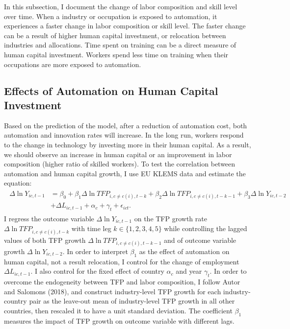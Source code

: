 \documentclass[12pt]{article}
\begin{document}
In this subsection, I document the change of labor composition and skill level over time. When a industry or occupation is exposed to automation, it experiences a faster change in labor composition or skill level. The faster change can be a result of higher human capital investment, or relocation between industries and allocations. Time spent on training can be a direct measure of human capital investment. Workers spend less time on training when their occupations are more exposed to automation. 

\subsection{Effects of Automation on Human Capital Investment}
Based on the prediction of the model, after a reduction of automation cost, both automation and innovation rates will increase. In the long run, workers respond to the change in technology by investing more in their human capital. As a result, we should observe an increase in human capital or an improvement in labor composition (higher ratio of skilled workers). To test the correlation between automation and human capital growth, I use EU KLEMS data and estimate the equation:
\begin{align}
\begin{split}
 \Delta \ln Y_{i c, t-1} &=\beta_{0}+\beta_{1} \Delta \ln TFP_{i, c \neq c(i), t-k} +\beta_{2} \Delta \ln TFP_{i, c \neq c(i), t-k-1}+\beta_{3} \Delta \ln Y_{i c, t-2}\\
 &+\Delta L_{i c, t-1}+\alpha_{c}+\gamma_{t}+\epsilon_{ict}.
 \end{split}
\end{align}
I regress the outcome variable $\Delta \ln Y_{i c, t-1}$ on the TFP growth rate $\Delta \ln TFP_{i, c \neq c(i), t-k}$ with time leg $k \in \{1,2,3,4,5\}$ while controlling the lagged values of both TFP growth $\Delta \ln TFP_{i, c \neq c(i), t-k-1}$ and of outcome variable growth $\Delta \ln Y_{ic, t-2}$. In order to interpret $\beta_{1}$ as the effect of automation on human capital, not a result relocation, I control for the change of employment $\Delta L_{i c, t-1}$. I also control for the fixed effect of country $\alpha_{c}$ and year $\gamma_{t}$. In order to overcome the endogeneity between TFP and labor composition, I follow Autor and Salomons (2018)\nocite{AutorSalomons2018}, and construct industry-level TFP growth for each industry-country pair as the leave-out mean of industry-level TFP growth in all other countries, then rescaled it to have a unit standard deviation. The coefficient $\beta_{1}$ measures the impact of TFP growth on outcome variable with different lags. 
\end{document}
